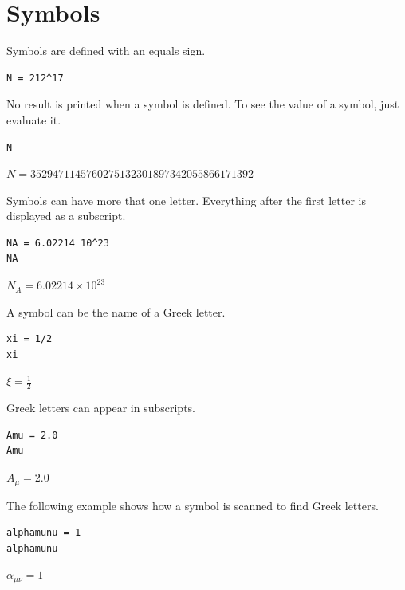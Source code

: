 \documentclass[12pt]{article}
\begin{document}
\newpage

\section{Symbols}

Symbols are defined with an equals sign.

{\color{blue}
\begin{verbatim}
N = 212^17
\end{verbatim}
}

No result is printed when a symbol is defined.
To see the value of a symbol, just evaluate it.

{\color{blue}
\begin{verbatim}
N
\end{verbatim}
}

$\displaystyle N=3529471145760275132301897342055866171392$

\bigskip

Symbols can have more that one letter.
Everything after the first letter is displayed as a subscript.

{\color{blue}
\begin{verbatim}
NA = 6.02214 10^23
NA
\end{verbatim}
}

$\displaystyle N_A=6.02214\times10^{23}$

\bigskip

A symbol can be the name of a Greek letter.

{\color{blue}
\begin{verbatim}
xi = 1/2
xi
\end{verbatim}
}

$\displaystyle \xi=\tfrac{1}{2}$

\bigskip

Greek letters can appear in subscripts.

{\color{blue}
\begin{verbatim}
Amu = 2.0
Amu
\end{verbatim}
}

$\displaystyle A_\mu=2.0$

\bigskip

The following example shows how a symbol is scanned to find Greek letters.

{\color{blue}
\begin{verbatim}
alphamunu = 1
alphamunu
\end{verbatim}
}

$\displaystyle \alpha_{\mu\nu}=1$
\end{document}
